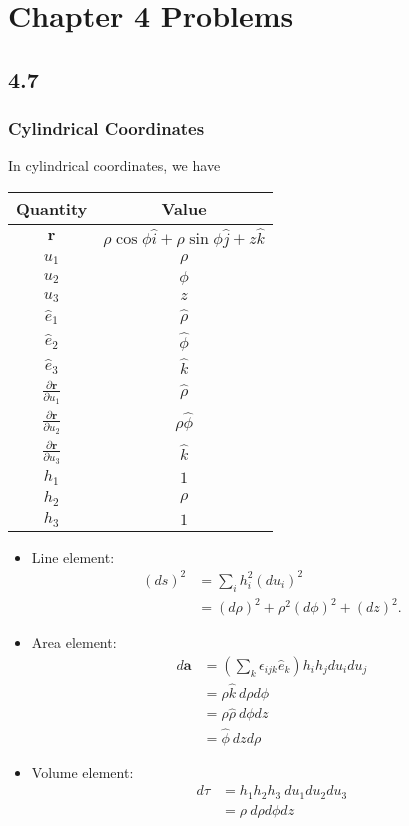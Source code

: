 \documentclass[10pt]{mypackage}
\begin{document}
\RaggedRight

\section{Chapter 4 Problems}%
  \renewcommand{\arraystretch}{1.5}
\subsection{4.7}%
\subsubsection{Cylindrical Coordinates}%
In cylindrical coordinates, we have
\begin{center}
  \begin{tabular}{c|c}
    Quantity & Value\\
    \hline \hline
    $\mathbf{r}$ & $\rho\cos\phi\hat{i} + \rho\sin\phi\hat{j} + z\hat{k}$\\
    \hline
    $u_1$ & $\rho$\\
    $u_2$ & $\phi$\\
    $u_3$ & $z$\\
    \hline
    $\hat{e}_1$ & $\hat{\rho}$\\
    $\hat{e}_2$ & $\hat\phi$\\
    $\hat{e}_3$ & $\hat{k}$\\
    \hline
    $\frac{\partial \mathbf{r}}{\partial u_1}$ & $\hat\rho$\\
    $\frac{\partial \mathbf{r}}{\partial u_2}$ & $\rho\hat\phi$\\
    $\frac{\partial \mathbf{r}}{\partial u_3}$ & $\hat k$\\
    \hline
    $h_1$ & $1$\\
    $h_2$ & $\rho$\\
    $h_3$ & $1$
  \end{tabular}
\end{center}
\begin{itemize}
  \item Line element:
    \begin{align*}
      \left(ds\right)^2 &= \sum_{i}h_i^2 \left(du_i\right)^2\\
                        &= \left(d\rho\right)^2 + \rho^2\left(d\phi\right)^2 + \left(dz\right)^2.
    \end{align*}
  \item Area element:
    \begin{align*}
      d\mathbf{a} &= \left(\sum_{k}\epsilon_{ijk}\hat{e}_k\right)h_ih_jdu_i du_j\\
                  &= \rho\hat{k}\: d\rho d\phi\\
                  &= \rho\hat{\rho}\: d\phi dz\\
                  &= \hat{\phi}\: dz d\rho
    \end{align*}
  \item Volume element:
    \begin{align*}
      d\tau &= h_1h_2h_3\: du_1 du_2 du_3\\
            &= \rho\: d\rho d\phi dz
    \end{align*}
\end{itemize}
\end{document}

